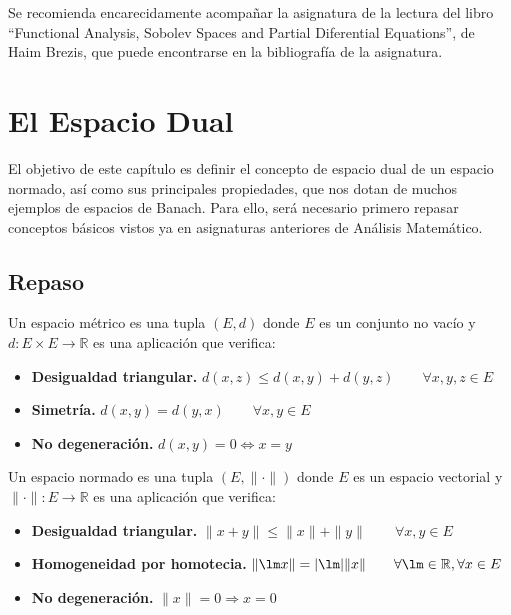 \noindent
Se recomienda encarecidamente acompañar la asignatura de la lectura del libro ``Functional Analysis, Sobolev Spaces and Partial Diferential Equations'', de Haim Brezis, que puede encontrarse en la bibliografía de la asignatura.\newpage


\chapter{El Espacio Dual}
El objetivo de este capítulo es definir el concepto de espacio dual de un espacio normado, así como sus principales propiedades, que nos dotan de muchos ejemplos de espacios de Banach. Para ello, será necesario primero repasar conceptos básicos vistos ya en asignaturas anteriores de Análisis Matemático.

\section{Repaso}
\begin{definicion}
    Un espacio métrico es una tupla $(E, d)$ donde $E$ es un conjunto no vacío y $d:E\times E \to \mathbb{R}$ es una aplicación que verifica:
    \begin{itemize}
        \item \textbf{Desigualdad triangular.} $d(x,z) \leq d(x,y) + d(y,z) \qquad \forall x,y,z\in E$
        \item \textbf{Simetría.} $d(x,y) = d(y,x) \qquad \forall x,y\in E$
        \item \textbf{No degeneración.} $d(x,y) = 0 \Longleftrightarrow x = y$
    \end{itemize}
\end{definicion}

\begin{definicion}
    Un espacio normado es una tupla $(E, \|\cdot \|)$ donde $E$ es un espacio vectorial y $\|\cdot \|:E\to \mathbb{R}$ es una aplicación que verifica:
    \begin{itemize}
        \item \textbf{Desigualdad triangular.} $\|x + y\| \leq \|x\| + \|y\| \qquad \forall x,y\in E$
        \item \textbf{Homogeneidad por homotecia.} $\|\lm x\| = |\lm| \|x\| \qquad \forall \lm \in \mathbb{R}, \forall x\in E$
        \item \textbf{No degeneración.} $\|x\| = 0 \Longrightarrow x = 0$
    \end{itemize}
\end{definicion}

